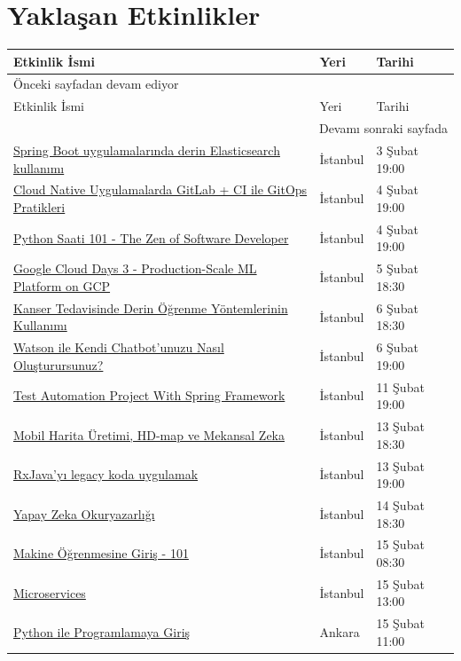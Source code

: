 \documentclass[11pt]{article}
\begin{document}
\section{Yaklaşan Etkinlikler}
\label{sec:org1b44425}
\begin{longtable}{|p{8cm}|l|l|}
\hline
Etkinlik İsmi & Yeri & Tarihi\\
\hline
\endfirsthead
\multicolumn{3}{l}{Önceki sayfadan devam ediyor} \\
\hline

Etkinlik İsmi & Yeri & Tarihi \\

\hline
\endhead
\hline\multicolumn{3}{r}{Devamı sonraki sayfada} \\
\endfoot
\endlastfoot
\hline
\href{https://www.meetup.com/Istanbul-Spring-Meetup/events/267716831/}{Spring Boot uygulamalarında derin Elasticsearch kullanımı} & İstanbul & 3 Şubat 19:00\\
\href{https://www.meetup.com/trendyol/events/267805404/}{Cloud Native Uygulamalarda GitLab + CI ile GitOps Pratikleri} & İstanbul & 4 Şubat 19:00\\
\href{https://www.meetup.com/python-istanbul/events/268319431/}{Python Saati 101 - The Zen of Software Developer} & İstanbul & 4 Şubat 19:00\\
\href{https://www.meetup.com/GDG-Cloud-Istanbul/events/268195069/}{Google Cloud Days 3 - Production-Scale ML Platform on GCP} & İstanbul & 5 Şubat 18:30\\
\href{https://kommunity.com/kodluyoruz/events/kanser-tedavisinde-derin-ogrenme-yontemlerinin-kullanimi}{Kanser Tedavisinde Derin Öğrenme Yöntemlerinin Kullanımı} & İstanbul & 6 Şubat 18:30\\
\href{https://www.meetup.com/IBMCloudTR/events/268323729/}{Watson ile Kendi Chatbot'unuzu Nasıl Oluşturursunuz?} & İstanbul & 6 Şubat 19:00\\
\href{https://www.meetup.com/TestHive/events/268357425/}{Test Automation Project With Spring Framework} & İstanbul & 11 Şubat 19:00\\
\href{https://www.meetup.com/Mekansal-Zeka/events/267511327/}{Mobil Harita Üretimi, HD-map ve Mekansal Zeka} & İstanbul & 13 Şubat 18:30\\
\href{https://www.meetup.com/Istanbul-Java-User-Group/events/267929475/}{RxJava'yı legacy koda uygulamak} & İstanbul & 13 Şubat 19:00\\
\href{https://www.meetup.com/ING-\%25C4\%25B0novasyon-Merkezi/events/268406663/}{Yapay Zeka Okuryazarlığı} & İstanbul & 14 Şubat 18:30\\
\href{https://www.meetup.com/Akademi-4-0/events/268053643/}{Makine Öğrenmesine Giriş - 101} & İstanbul & 15 Şubat 08:30\\
\href{https://kommunity.com/istanbulphp/events/microservices}{Microservices} & İstanbul & 15 Şubat 13:00\\
\href{https://www.meetup.com/GDGAnkara/events/268384563/}{Python ile Programlamaya Giriş} & Ankara & 15 Şubat 11:00\\
\hline
\end{longtable}
\end{document}
